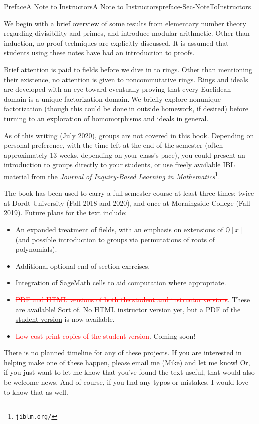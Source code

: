 \documentclass[oneside,10pt,]{book}
\newcommand{\deletethick}{.25ex}
\newcommand{\deleted}[1]{\renewcommand{\ULthickness}{\deletethick}\textcolor{red}{\sout{#1}}}
\numberwithin{equation}{section}
\def\Q{{\mathbb Q}}
\begin{document}
\begin{preface}{Preface}{A Note to Instructors}{}{A Note to Instructors}{}{}{preface-Sec-NoteToInstructors}
\begin{itemize}[label=\textbullet]
\end{itemize}
%
\par
We begin with a brief overview of some results from elementary number theory regarding divisibility and primes, and introduce modular arithmetic. Other than induction, no proof techniques are explicitly discussed. It is assumed that students using these notes have had an introduction to proofs.%
\par
Brief attention is paid to fields before we dive in to rings. Other than mentioning their existence, no attention is given to noncommutative rings. Rings and ideals are developed with an eye toward eventually proving that every Euclidean domain is a unique factorization domain. We briefly explore nonunique factorization (though this could be done in outside homework, if desired) before turning to an exploration of homomorphisms and ideals in general.%
\par
As of this writing (July 2020), groups are not covered in this book. Depending on personal preference, with the time left at the end of the semester (often approximately 1\textendash{}3 weeks, depending on your class's pace), you could present an introduction to groups directly to your students, or use freely available IBL material from the \href{http://jiblm.org/}{\emph{Journal of Inquiry-Based Learning in Mathematics}}\footnote{\nolinkurl{jiblm.org/}\label{fn-Sec-NoteToInstructors-f-c}}.%
\par
The book has been used to carry a full semester course at least three times: twice at Dordt University (Fall 2018 and 2020), and once at Morningside College (Fall 2019). Future plans for the text include:%
\begin{itemize}[label=\textbullet]
\item{}An expanded treatment of fields, with an emphasis on extensions of \(\Q[x]\) (and possible introduction to groups via permutations of roots of polynomials).%
\item{}Additional optional end-of-section exercises.%
\item{}Integration of SageMath cells to aid computation where appropriate.%
\item{}\deleted{PDF and HTML versions of both the student and instructor versions}. These are available! Sort of. No HTML instructor version yet, but a \hyperref[preface-Sec-Versions]{PDF of the student version} is now available.%
\item{}\deleted{Low-cost print copies of the student version}. Coming soon!%
\end{itemize}
There is no planned timeline for any of these projects. If you are interested in helping make one of these happen, please email me (Mike) and let me know! Or, if you just want to let me know that you've found the text useful, that would also be welcome news. And of course, if you find any typos or mistakes, I would love to know that as well.%
\end{preface}
\end{document}
